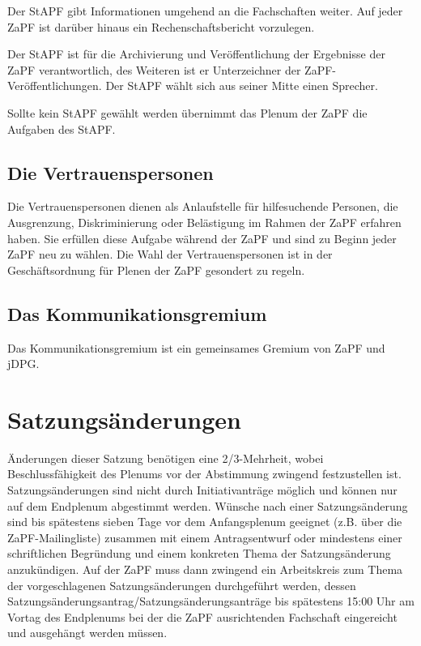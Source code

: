\documentclass[draft,12pt,oneside]{scrreprt}
\begin{document}
Der StAPF gibt Informationen umgehend an die Fachschaften weiter.
Auf jeder ZaPF ist darüber hinaus ein Rechenschaftsbericht vorzulegen.

Der StAPF ist für die Archivierung und Veröffentlichung der Ergebnisse der ZaPF
verantwortlich, des Weiteren ist er Unterzeichner der ZaPF-Veröffentlichungen.
Der StAPF wählt sich aus seiner Mitte einen Sprecher.

Sollte kein StAPF gewählt werden übernimmt das Plenum der ZaPF die Aufgaben des StAPF.

\subsection{Die Vertrauenspersonen}

Die Vertrauenspersonen dienen als Anlaufstelle für hilfesuchende Personen, die
Ausgrenzung, Diskriminierung oder Belästigung im Rahmen der ZaPF erfahren haben.
Sie erfüllen diese Aufgabe während der ZaPF und sind zu Beginn jeder ZaPF neu
zu wählen.
Die Wahl der Vertrauenspersonen ist in der Geschäftsordnung für Plenen der ZaPF
gesondert zu regeln.

\subsection{Das Kommunikationsgremium}

Das Kommunikationsgremium ist ein gemeinsames Gremium von ZaPF und jDPG.

\section{Satzungsänderungen}
Änderungen dieser Satzung benötigen eine 2/3-Mehrheit, wobei Beschlussfähigkeit
des Plenums vor der Abstimmung zwingend festzustellen ist. Satzungsänderungen
sind nicht durch Initiativanträge möglich und können nur auf dem Endplenum
abgestimmt werden. Wünsche nach einer Satzungsänderung sind bis spätestens
sieben Tage vor dem Anfangsplenum geeignet (z.B. über die ZaPF-Mailingliste)
zusammen mit einem Antragsentwurf oder mindestens einer schriftlichen
Begründung und einem konkreten Thema der Satzungsänderung anzukündigen. Auf der
ZaPF muss dann zwingend ein Arbeitskreis zum Thema der vorgeschlagenen
Satzungsänderungen durchgeführt werden, dessen
Satzungsänderungsantrag/Satzungsänderungsanträge bis spätestens 15:00 Uhr am
Vortag des Endplenums bei der die ZaPF ausrichtenden Fachschaft eingereicht und
ausgehängt werden müssen.
\end{document}
